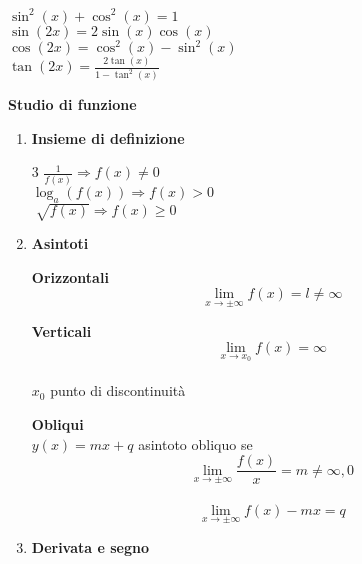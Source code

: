 \documentclass[10pt]{article}
\begin{document}
\begin{multicols}{4}
$\sin^2(x) + \cos^2(x) = 1$\\
$\sin(2x) = 2\sin(x)\cos(x)$\\
$\cos(2x) = \cos^2(x) - \sin^2(x)$\\
$\tan(2x) = \frac{2\tan(x)}{1 - \tan^2(x)} $
\end{multicols}
\pagebreak
\maketitle
\textbf{Studio di funzione}
\begin{enumerate}
	\item \textbf{Insieme di definizione}
	\begin{multicols} {3}
		$\frac{1}{f(x)} \Rightarrow f(x) \neq 0$\\
		$\log_a(f(x)) \Rightarrow f(x) > 0$\\
		$\sqrt[]{f(x)} \Rightarrow f(x) \geq 0$
	\end{multicols}
	\item \textbf{Asintoti}
	\begin{multicols}{3}
		\textbf{Orizzontali}\\
		$$\lim_{x\to\pm\infty} f(x) = l \neq \infty$$
		\columnbreak
		
		\textbf{Verticali}\\
		$$\lim_{x\to x_0} f(x) = \infty$$\\
		$x_0$ punto di discontinuità
		\columnbreak
		
		\textbf{Obliqui}\\
		$y(x) = mx + q$ asintoto obliquo se\\
		$$\lim_{x\to\pm\infty} \frac{f(x)}{x} = m \neq \infty, 0$$\\
		$$\lim_{x\to\pm\infty} f(x) - mx = q$$
	\end{multicols}
	\item \textbf{Derivata e segno}
\end{enumerate}
\end{document}
